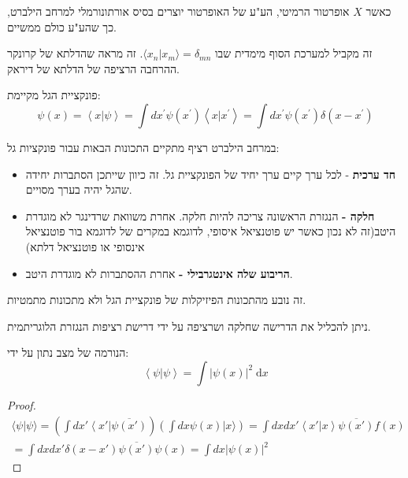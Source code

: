 \documentclass{tstextbook}
\begin{document}
\begin{proposition}
כאשר \(X\) אופרטור הרמיטי, הע"ע של האופרטור יוצרים בסיס אורתונורמלי למרחב הילברט, כך שהע"ע כולם ממשיים.

\end{proposition}
\begin{remark}
זה מקביל למערכת הסוף מימדית שבו \(\langle x_{n}|x_{m} \rangle=\delta_{mn}\). זה מראה שהדלתא של קרונקר ההרחבה הרציפה של הדלתא של דיראק.

\end{remark}
\begin{proposition}
פונקציית הגל מקיימת:
$$\psi\left(x\right)=\left\langle x|\psi\right\rangle=\int d x^{\prime}\psi\left(x^{\prime}\right)\left\langle x|x^{\prime}\right\rangle=\int d x^{\prime}\psi\left(x^{\prime}\right)\delta\left(x-x^{\prime}\right)$$

\end{proposition}
\begin{proposition}
במרחב הילברט רציף מתקיים התכונות הבאות עבור פונקציות גל:

  \begin{itemize}
    \item \textbf{חד ערכית} - לכל ערך קיים ערך יחיד של הפונקציית גל. זה כיוון שייתכן הסתברות יחידה שהגל יהיה בערך מסויים.
    \item \textbf{חלקה -} הנגזרת הראשונה צריכה להיות חלקה. אחרת משוואת שרדינגר לא מוגדרת היטב(זה לא נכון כאשר יש פוטנציאל איסופי, לדוגמא במקרים של לדוגמא בור פוטנציאל אינסופי או פוטנציאל דלתא)
    \item \textbf{הריבוע שלה אינטגרבילי -} אחרת ההסתברות לא מוגדרת היטב.
  \end{itemize}
זה נובע מהתכונות הפיזיקלות של פונקציית הגל ולא מתכונות מתמטיות.

\end{proposition}
\begin{corollary}
ניתן להכליל את הדרישה שחלקה ושרציפה על ידי דרישת רציפות הנגזרת הלוגריתמית.

\end{corollary}
\begin{proposition}
הנורמה של מצב נתון על ידי:
$$\left\langle  \psi|\psi  \right\rangle = \int  \left\lvert  \psi(x)  \right\rvert ^2 \; \mathrm{d}x$$

\end{proposition}
\begin{proof}
\begin{gather*}\langle\psi|\psi\rangle=\left(\int dx'\left\langle x'\right|\overline{\psi\left(x'\right)}\right)\left(\int dx\psi\left(x\right)|x\rangle\right)=\int dxdx'\left\langle x'|x\right\rangle\overline{\psi\left(x'\right)}f\left(x\right)\\=\int dxdx'\delta\left(x-x'\right)\overline{\psi\left(x'\right)}\psi\left(x\right)=\int dx\left|\psi\left(x\right)\right|^{2} 
\end{gather*}

\end{proof}
\end{document}
